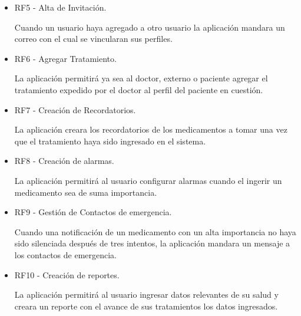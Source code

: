 \begin{itemize}
		\item RF5 - Alta de Invitación.
		
		Cuando un usuario haya agregado a otro usuario la aplicación mandara un correo con el cual se vincularan sus perfiles.
		
		\item RF6 - Agregar Tratamiento.
		
		La aplicación permitirá  ya sea al doctor, externo o paciente agregar el tratamiento expedido por el doctor al perfil del paciente en cuestión.
		
		\item RF7 - Creación de Recordatorios.
		
		La aplicación creara los recordatorios de los medicamentos a tomar  una vez que el tratamiento haya sido ingresado en el sistema.
		
		\item RF8 - Creación de alarmas.
		
		La aplicación permitirá al usuario configurar alarmas cuando el ingerir un medicamento sea de suma importancia.
		
		\item RF9 - Gestión de Contactos de emergencia.
		
		Cuando una notificación de un medicamento con un alta importancia no haya sido silenciada después de tres intentos, la aplicación mandara un mensaje a los contactos de emergencia.
		
		\item RF10 - Creación de reportes.
		
		La aplicación permitirá al usuario ingresar datos relevantes de su salud y creara un reporte con el avance de sus tratamientos los datos ingresados.
\end{itemize}


